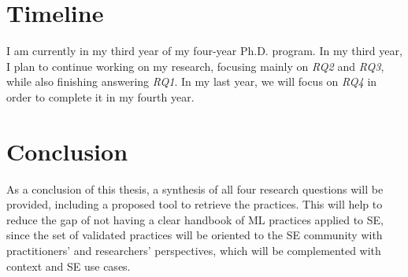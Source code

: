 \section{Timeline}
\label{sec:time}

I am currently in my third year of my four-year Ph.D. program. In my third year, I plan to continue working on  my research, focusing mainly on \textit{RQ2} and \textit{RQ3}, while also finishing answering \textit{RQ1}.   In my last year, we will focus on \textit{RQ4} in order to complete it in my fourth year.

\section{Conclusion}
\label{sec:concl}

As a conclusion of this thesis, a synthesis of all four research questions will be provided, including a proposed tool to retrieve the practices.  This will help to reduce the gap of not having a clear handbook of ML practices applied to SE, since the set of validated practices will be oriented to the SE community with practitioners' and researchers' perspectives, which will be complemented with context and SE use cases.
